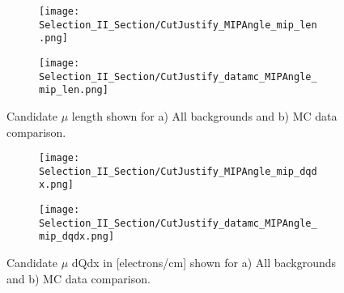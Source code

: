 \begin{figure}[h!]
\centering
  \begin{subfigure}[t]{0.3\textwidth}
    \centering
\texttt{[image: Selection\_II\_Section/CutJustify\_MIPAngle\_mip\_len.png]}
    \caption{ }
  \end{subfigure} 
  \hspace{20mm}
  \begin{subfigure}[t]{0.3\textwidth}
    \centering
\texttt{[image: Selection\_II\_Section/CutJustify\_datamc\_MIPAngle\_mip\_len.png]}
    \caption{ }
  \end{subfigure} 

\caption{ Candidate $\mu$ length shown for a) All backgrounds and b) MC data comparison. }
\label{fig:cutjust_sel2_multall_len}
\end{figure}


\begin{figure}[h!]
\centering
  \begin{subfigure}[t]{0.3\textwidth}
    \centering
\texttt{[image: Selection\_II\_Section/CutJustify\_MIPAngle\_mip\_dqdx.png]}
    \caption{ }
  \end{subfigure} 
  \hspace{20mm}
  \begin{subfigure}[t]{0.3\textwidth}
    \centering
\texttt{[image: Selection\_II\_Section/CutJustify\_datamc\_MIPAngle\_mip\_dqdx.png]}
    \caption{ }
  \end{subfigure} 
\caption{ Candidate $\mu$ dQdx in [electrons/cm] shown for a) All backgrounds and b) MC data comparison. }
\label{fig:cutjust_sel2_multall_dqdx}
\end{figure}

